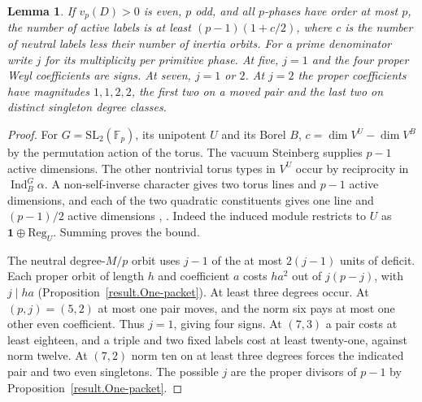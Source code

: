 \documentclass[11pt]{amsart}
\numberwithin{equation}{section}
\newtheorem{lemma}[theorem]{Lemma}
\theoremstyle{definition}
\theoremstyle{plain}
\begin{document}
\begin{lemma}\label{result:five-reduction}
If $v_p(D)>0$ is even, $p$ odd, and all $p$-phases have order at most
$p$, the number of active labels is at least $(p-1)(1+c/2)$, where
$c$ is the number of neutral labels less their number of inertia orbits.
For a prime denominator write $j$ for its multiplicity per primitive
phase. At five, $j=1$ and the four proper Weyl coefficients are signs.
At seven, $j=1$ or $2$. At $j=2$ the proper coefficients have magnitudes
$1,1,2,2$, the first two on a moved pair and the last two on distinct
singleton degree classes.
\end{lemma}
\begin{proof}
For $G=\mathrm{SL}_2(\mathbb F_p)$, its unipotent $U$ and its Borel
$B$, $c=\dim V^U-\dim V^B$ by the permutation action of the torus.
The vacuum Steinberg supplies $p-1$ active dimensions. The other
nontrivial torus types in $V^U$ occur by reciprocity in
$\operatorname{Ind}_B^G\alpha$. A non-self-inverse character gives
two torus lines and $p-1$ active dimensions, and each of the two
quadratic constituents gives one line and $(p-1)/2$ active dimensions
\cite[Prop.~2.14]{PrasadSL}, \cite[Lem.~4.3]{Nevins}.
Indeed the induced module restricts to $U$ as
$\mathbf1\oplus\mathrm{Reg}_U$. Summing proves the bound.

The neutral degree-$M/p$ orbit uses $j-1$ of the at most $2(j-1)$
units of deficit. Each proper orbit of length $h$ and coefficient
$a$ costs $ha^2$ out of $j(p-j)$, with $j\mid ha$
(Proposition~\ref{result.One-packet}). At least three degrees occur.
At $(p,j)=(5,2)$ at most one pair moves, and the norm six pays at
most one other even coefficient. Thus $j=1$, giving four signs.
At $(7,3)$ a pair costs at least eighteen, and a triple and two
fixed labels cost at least twenty-one, against norm twelve. At
$(7,2)$ norm ten on at least three degrees forces the indicated
pair and two even singletons. The possible $j$ are the proper
divisors of $p-1$ by Proposition~\ref{result.One-packet}.
\end{proof}
\end{document}

